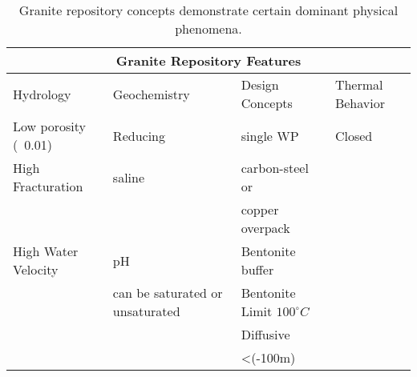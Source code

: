 %
\begin{table}[h!]
  \centering
  \footnotesize{
  \begin{tabular}{|l|l|l|l|}
    \multicolumn{4}{c}{\textbf{Granite Repository Features}}\\
    \hline
    Hydrology & Geochemistry & Design Concepts & Thermal Behavior \\ 
    \hline
    Low porosity (~0.01)&Reducing&single WP&Closed\\
    High Fracturation & saline & carbon-steel or &\\
    &&copper overpack&\\
    High Water Velocity& pH & Bentonite buffer &\\
    &can be saturated or unsaturated&Bentonite Limit $100^\circ C$&\\
    &&Diffusive&\\
    &&<(-100m)&\\
    \hline
  \end{tabular}
  \caption[Granite Repository Features]{Granite repository 
  concepts demonstrate certain dominant physical phenomena.}
  \label{tab:granite_tab}
  }
\end{table}



